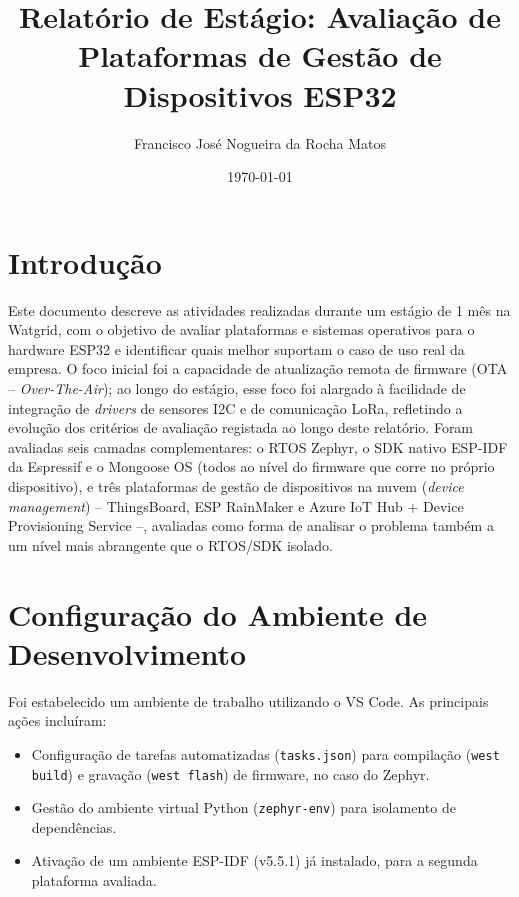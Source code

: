 \documentclass[a4paper,12pt]{article}
\begin{document}
\title{Relatório de Estágio: Avaliação de Plataformas de Gestão de Dispositivos ESP32}
\author{Francisco José Nogueira da Rocha Matos}
\date{\today}

\maketitle

\tableofcontents
\newpage

\section{Introdução}
Este documento descreve as atividades realizadas durante um estágio de 1 mês na Watgrid, com o objetivo de avaliar plataformas e sistemas operativos para o hardware ESP32 e identificar quais melhor suportam o caso de uso real da empresa. O foco inicial foi a capacidade de atualização remota de firmware (OTA -- \textit{Over-The-Air}); ao longo do estágio, esse foco foi alargado à facilidade de integração de \textit{drivers} de sensores I2C e de comunicação LoRa, refletindo a evolução dos critérios de avaliação registada ao longo deste relatório. Foram avaliadas seis camadas complementares: o RTOS Zephyr, o SDK nativo ESP-IDF da Espressif e o Mongoose OS (todos ao nível do firmware que corre no próprio dispositivo), e três plataformas de gestão de dispositivos na nuvem (\textit{device management}) -- ThingsBoard, ESP RainMaker e Azure IoT Hub + Device Provisioning Service --, avaliadas como forma de analisar o problema também a um nível mais abrangente que o RTOS/SDK isolado.

\section{Configuração do Ambiente de Desenvolvimento}
Foi estabelecido um ambiente de trabalho utilizando o VS Code. As principais ações incluíram:
\begin{itemize}
    \item Configuração de tarefas automatizadas (\texttt{tasks.json}) para compilação (\texttt{west build}) e gravação (\texttt{west flash}) de firmware, no caso do Zephyr.
    \item Gestão do ambiente virtual Python (\texttt{zephyr-env}) para isolamento de dependências.
    \item Ativação de um ambiente ESP-IDF (v5.5.1) já instalado, para a segunda plataforma avaliada.
\end{itemize}
\end{document}

